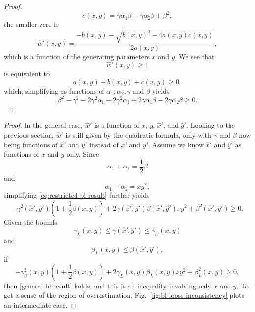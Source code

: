 \begin{proof}
$$c(x, y) = \gamma \alpha_1 \beta - \gamma \alpha_2 \beta + \beta^2,
$$
the smaller zero is
$$
\hat{w}'(x, y) = \frac{-b(x, y) - \sqrt{b(x, y)^2 - 4a(x, y)c(x, y)}}{2a(x, y)},
$$
which is a function of the generating parameters $x$ and $y$.
We see that
$$
\hat{w}'(x, y) \ge 1
$$
is equivalent to
$$
a(x, y) + b(x, y) + c(x, y) \ge 0,
$$
which, simplifying as functions of $\alpha_1, \alpha_2, \gamma$ and $\beta$ yields
\begin{equation}
\label{eq:restricted-bl-result}
\beta^2-\gamma^2-2\gamma^2\alpha_1-2\gamma^2\alpha_2+2\gamma\alpha_1\beta-2\gamma\alpha_2\beta \ge 0.
\end{equation}
\end{proof}

\generalBranchInconsist*

\begin{proof}
In the general case, $\hat{w}'$ is a function of $x$, $y$, $\hat{x}'$, and $\hat{y}'$.
Looking to the previous section, $\hat{w}'$ is still given by the quadratic formula, only with $\gamma$ and $\beta$ now being functions of $\hat{x}'$ and $\hat{y}'$ instead of $x'$ and $y'$.
Assume we know $\hat{x}'$ and $\hat{y}'$ as functions of $x$ and $y$ only.
Since
$$
\alpha_1 + \alpha_2 = \frac{1}{2}\beta
$$
and
$$
\alpha_1 - \alpha_2 = xy^2,
$$
simplifying \eqref{eq:restricted-bl-result} further yields
\begin{equation}
\label{eq:general-bl-result}
-\gamma^2(\hat{x}', \hat{y}')(1 + \frac{1}{2}\beta(x, y)) + 2\gamma(\hat{x}', \hat{y}')\beta(\hat{x}', \hat{y}')xy^2 + \beta^2(\hat{x}', \hat{y}') \ge 0.
\end{equation}
Given the bounds
$$
\gamma_{L}(x, y) \le \gamma(\hat{x}', \hat{y}') \le \gamma_{U}(x, y)
$$
and
$$
\beta_{L}(x, y) \le \beta(\hat{x}', \hat{y}'),
$$
if
$$
-\gamma_{U}^2(x, y)(1 + \frac{1}{2}\beta(x, y)) + 2\gamma_{L}(x, y)\beta_{L}(x, y)xy^2 + \beta_{L}^2(x, y) \ge 0,
$$
then \eqref{general-bl-result} holds, and this is an inequality involving only $x$ and $y$.
To get a sense of the region of overestimation, Fig.~\ref{fig:bl-loose-inconsistency} plots an intermediate case.
\end{proof}

